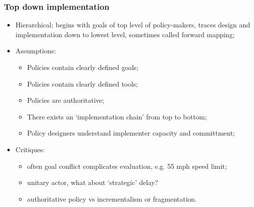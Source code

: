 \documentclass[aspectratio=169]{beamer}
\theoremstyle{principle}
\begin{document}
\begin{frame}
\frametitle{Top down implementation}

\begin{itemize}
\item Hierarchical; begins with goals of top level of policy-makers, traces design and implementation down to lowest level, sometimes called forward mapping;
\bigskip
\bigskip
\item Assumptions:
\begin{itemize}
\item Policies contain clearly defined goals;
\item Policies contain clearly defined tools;
\item Policies are authoritative;
\item There exists an `implementation chain' from top to bottom;
\item Policy designers understand implementer capacity and committment;
\end{itemize}
\bigskip
\bigskip
\item Critiques: 
\begin{itemize}
\item often goal conflict complicates evaluation, e.g. 55 mph speed limit; 
\item unitary actor, what about `strategic' delay?
\item authoritative policy vs incrementalism or fragmentation.
\end{itemize}
\end{itemize}

\end{frame}
\end{document}
